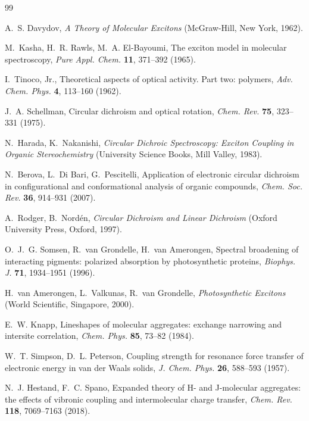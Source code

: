 \documentclass[11pt,a4paper]{article}
\begin{document}
\begin{thebibliography}{99}

A.~S. Davydov, \emph{A Theory of Molecular Excitons} (McGraw-Hill, New York,
1962).

M.~Kasha, H.~R. Rawls, M.~A. El-Bayoumi,
The exciton model in molecular spectroscopy,
\emph{Pure Appl. Chem.} \textbf{11}, 371--392 (1965).

I.~Tinoco, Jr.,
Theoretical aspects of optical activity. Part two: polymers,
\emph{Adv. Chem. Phys.} \textbf{4}, 113--160 (1962).

J.~A. Schellman,
Circular dichroism and optical rotation,
\emph{Chem. Rev.} \textbf{75}, 323--331 (1975).

N.~Harada, K.~Nakanishi, \emph{Circular Dichroic Spectroscopy: Exciton
Coupling in Organic Stereochemistry} (University Science Books, Mill Valley,
1983).

N.~Berova, L.~Di Bari, G.~Pescitelli,
Application of electronic circular dichroism in configurational and
conformational analysis of organic compounds,
\emph{Chem. Soc. Rev.} \textbf{36}, 914--931 (2007).

A.~Rodger, B.~Nord\'en, \emph{Circular Dichroism and Linear Dichroism}
(Oxford University Press, Oxford, 1997).

O.~J.~G. Somsen, R.~van Grondelle, H.~van Amerongen,
Spectral broadening of interacting pigments: polarized absorption by
photosynthetic proteins,
\emph{Biophys. J.} \textbf{71}, 1934--1951 (1996).

H.~van Amerongen, L.~Valkunas, R.~van Grondelle,
\emph{Photosynthetic Excitons} (World Scientific, Singapore, 2000).

E.~W. Knapp,
Lineshapes of molecular aggregates: exchange narrowing and intersite
correlation,
\emph{Chem. Phys.} \textbf{85}, 73--82 (1984).

W.~T. Simpson, D.~L. Peterson,
Coupling strength for resonance force transfer of electronic energy in
van der Waals solids,
\emph{J. Chem. Phys.} \textbf{26}, 588--593 (1957).

N.~J. Hestand, F.~C. Spano,
Expanded theory of H- and J-molecular aggregates: the effects of vibronic
coupling and intermolecular charge transfer,
\emph{Chem. Rev.} \textbf{118}, 7069--7163 (2018).


\end{thebibliography}
\end{document}
